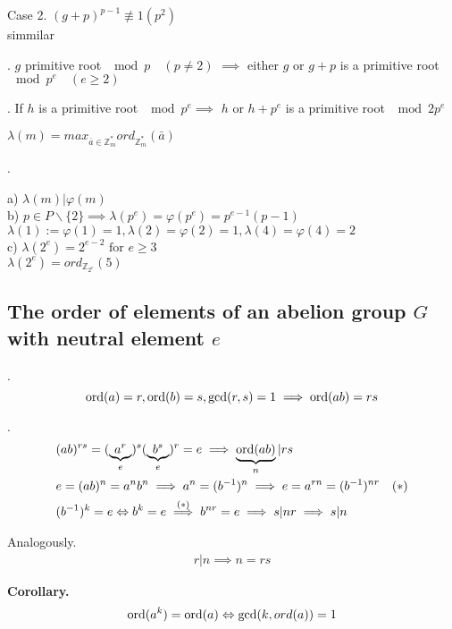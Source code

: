 Case 2. $(g+p)^{p-1} \not\equiv 1 (p^2)$\\
simmilar

\Lemma.
$g$ primitive root $\mod p \quad(p \neq 2)$ $\implies$ either $g$ or $g+p$ is a primitive root $\mod p^e \quad(e \geq 2)$

\Lemma.
If $h$ is a primitive root $\mod p^e \implies$ $h$ or $h+p^e$ is a primitive root $\mod 2p^e$

\begin{definition}
  $\lambda(m) = max_{\bar{a} \in \mathbb{Z}_m^{*}} ord_{\mathbb{Z}_m^{*}}(\bar{a})$
\end{definition}

\Remark.

a) $\lambda(m) | \varphi(m)$ \\
b) $p \in P \backslash\{2\} \implies \lambda(p^e) = \varphi(p^e) = p^{e-1}(p-1)$ \\
  $\lambda(1) := \varphi(1) = 1, \lambda(2) = \varphi(2) = 1, \lambda(4) = \varphi(4) = 2$\\
c) $\lambda(2^e) = 2^{e-2} \text{ for } e \geq 3$ \\
  $\lambda(2^e) = ord_{\mathbb{Z}_{2^e}}(5)$

\subsection{The order of elements of an abelion group $G$ with neutral element $e$}
\Theorem.
\[
  \operatorname{ord}(a) = r, \operatorname{ord}(b) = s, \gcd(r,s) = 1 \implies \operatorname{ord}(ab) = rs
\]

\Proof.
\begin{align*}
  &(ab)^{rs} = (\underbrace{a^r}_{e})^s (\underbrace{b^s}_{e})^r = e \implies \underbrace{\operatorname{ord}(ab)}_{n} |rs \\
  &e = (ab)^n = a^n b^n \implies a^n = (b^{-1})^n \implies e = a^{rn} = (b^{-1})^{nr} \quad (*)\\
  &(b^{-1})^k = e \Leftrightarrow b^k = e \stackrel{(*)}{\implies} b^{nr} = e \implies s|nr \implies s|n \\
\end{align*}

Analogously.
\begin{align*}
  r|n \implies n = rs
\end{align*}

\textbf{Corollary.}
\begin{align*}
  \operatorname{ord}(a^k) = \operatorname{ord}(a) \Leftrightarrow \gcd(k, ord(a)) = 1
\end{align*}

